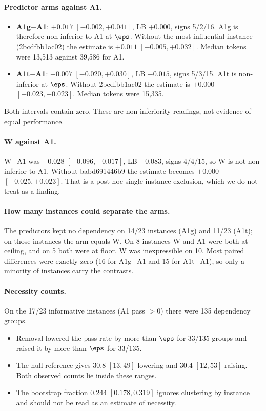 \paragraph{Predictor arms against A1.}
\begin{itemize}
\item \textbf{A1g$-$A1}: $+0.017$ $[-0.002, +0.041]$, LB $+0.000$, signs 5/2/16. A1g is therefore non-inferior to A1 at $\eps$. Without the most influential instance (2bcdfbb1ac02) the estimate is $+0.011$ $[-0.005, +0.032]$. Median tokens were 13,513 against 39,586 for A1.
\item \textbf{A1t$-$A1}: $+0.007$ $[-0.020, +0.030]$, LB $-0.015$, signs 5/3/15. A1t is non-inferior at $\eps$. Without 2bcdfbb1ac02 the estimate is $+0.000$ $[-0.023, +0.023]$. Median tokens were 15,335.
\end{itemize}
Both intervals contain zero. These are non-inferiority readings, not evidence of equal performance.

\paragraph{W against A1.} W$-$A1 was $-0.028$ $[-0.096, +0.017]$, LB $-0.083$, signs 4/4/15, so W is not non-inferior to A1. Without babd691446b9 the estimate becomes $+0.000$ $[-0.025, +0.023]$. That is a post-hoc single-instance exclusion, which we do not treat as a finding.

\paragraph{How many instances could separate the arms.} The predictors kept no dependency on 14/23 instances (A1g) and 11/23 (A1t); on those instances the arm equals W. On 8 instances W and A1 were both at ceiling, and on 5 both were at floor. W was inexpressible on 10. Most paired differences were exactly zero (16 for A1g$-$A1 and 15 for A1t$-$A1), so only a minority of instances carry the contrasts.

\paragraph{Necessity counts.} On the 17/23 informative instances (A1 pass $> 0$) there were 135 dependency groups.
\begin{itemize}
\item Removal lowered the pass rate by more than $\eps$ for 33/135 groups and raised it by more than $\eps$ for 33/135.
\item The null reference gives 30.8 $[13, 49]$ lowering and 30.4 $[12, 53]$ raising. Both observed counts lie inside these ranges.
\item The bootstrap fraction 0.244 $[0.178, 0.319]$ ignores clustering by instance and should not be read as an estimate of necessity.
\end{itemize}

